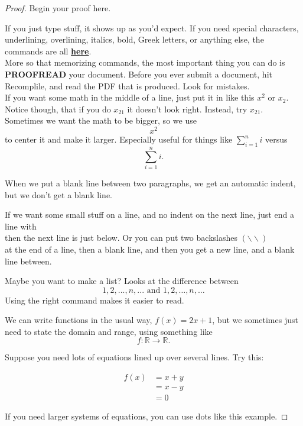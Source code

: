 \documentclass[12 pt]{article}
\theoremstyle{definition}
\newcommand{\R}{\mathbb{R}}
\begin{document}
\begin{proof}
Begin your proof here.

If you just type stuff, it shows up as you'd expect. If you need special characters, underlining, overlining, italics, bold, Greek letters, or anything else, the commands are all  \href{https://oeis.org/wiki/List_of_LaTeX_mathematical_symbols}{\textbf{here}}.\\

More so that memorizing commands, the most important thing you can do is \textbf{PROOFREAD} your document. Before you ever submit a document, hit Recomplile, and read the PDF that is produced. Look for mistakes.\\

If you want some math in the middle of a line, just put it in like this $x^2$ or $x_2$. Notice though, that if you do $x_21$ it doesn't look right. Instead, try $x_{21}$.\\

Sometimes we want the math to be bigger, so we use $$x^2$$ to center it and make it larger. Especially useful for things like $\sum_{i=1}^n i$ versus $$\sum_{i=1}^n i.$$

When we put a blank line between two paragraphs, we get an automatic indent, but we don't get a blank line.

If we want some small stuff on a line, and no indent on the next line, just end a line with \\
then the next line is just below. Or you can put two backslashes $(\backslash\backslash)$ \\

at the end of a line, then a blank line, and then you get a new line, and a blank line between.

Maybe you want to make a list? Looks at the difference between 
$$1,2,...,n,... \mbox{ and } 1,2,\ldots,n,\ldots$$
Using the right command makes it easier to read.

We can write functions in the usual way, $f(x) = 2x +1$, but we sometimes just need to state the domain and range, using something like $$f: \R \rightarrow \R.$$

Suppose you need lots of equations lined up over several lines. Try this:

\begin{align*}
f(x) &= x+y\\
&= x-y\\
&=0
\end{align*}

If you need larger systems of equations, you can use dots like this example.


\end{proof}
\end{document}
